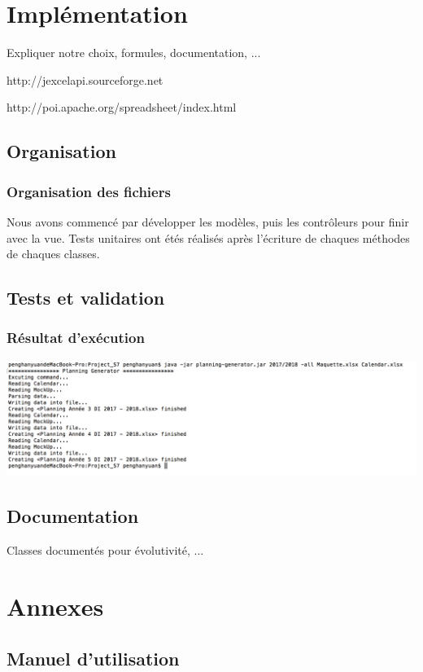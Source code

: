 \documentclass{polytech/polytech}
\begin{document}
	\chapter{Implémentation}

	Expliquer notre choix, formules, documentation, ...

	http://jexcelapi.sourceforge.net

	http://poi.apache.org/spreadsheet/index.html

	\section{Organisation}

	\subsection{Organisation des fichiers}

	Nous avons commencé par développer les modèles, puis les contrôleurs pour finir avec la vue.
	Tests unitaires ont étés réalisés après l'écriture de chaques méthodes de chaques classes.

	\section{Tests et validation}
	\subsection{Résultat d'exécution}
	\includegraphics[width=\textwidth]{./img/excution_result.png}
	\section{Documentation}

	Classes documentés pour évolutivité, ...

	\chapter{Annexes}

	\section{Manuel d'utilisation}
	
\end{document}
